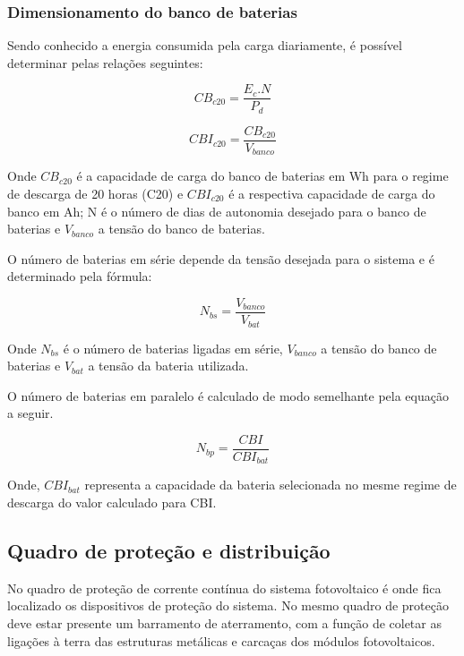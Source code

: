 \subsubsection{Dimensionamento do banco de baterias} 

	Sendo conhecido a energia consumida pela carga diariamente, é possível determinar pelas relações seguintes:

\begin{equation}
	CB_{c20} = \dfrac{E_c . N}{P_d}
\end{equation}

\begin{equation}
	CBI_{c20} = \dfrac{CB_{c20}}{V_{banco}}
\end{equation}

	Onde $CB_{c20}$ é a capacidade de carga do banco de baterias em Wh para o regime de descarga de 20 horas (C20) e $CBI_{c20}$ é a respectiva capacidade de carga do banco em Ah; N é o número de dias de autonomia desejado para o banco de baterias e $V_{banco}$ a tensão do banco de baterias.
	
	O número de baterias em série depende da tensão desejada para o sistema e é determinado pela fórmula:
	
	\begin{equation}
	N_{bs} = \dfrac{V_{banco}}{V_{bat}}
	\end{equation}

	Onde $N_{bs}$ é o número de baterias ligadas em série, $V_{banco}$ a tensão do banco de baterias e $V_{bat}$ a tensão da bateria utilizada.
	
	O número de baterias em paralelo é calculado de modo semelhante pela equação a seguir.
	
	\begin{equation}
	N_{bp} = \dfrac{CBI}{CBI_{bat}}
	\end{equation}
	
	Onde, $CBI_{bat}$ representa a capacidade da bateria selecionada no mesme regime de descarga do valor calculado para CBI.

\subsection{Quadro de proteção e distribuição} 

	No quadro de proteção de corrente contínua do sistema fotovoltaico é onde fica localizado os dispositivos de proteção do sistema. No mesmo quadro de proteção deve estar presente um barramento de aterramento, com a função de coletar as ligações à terra das estruturas metálicas e carcaças dos módulos fotovoltaicos.

